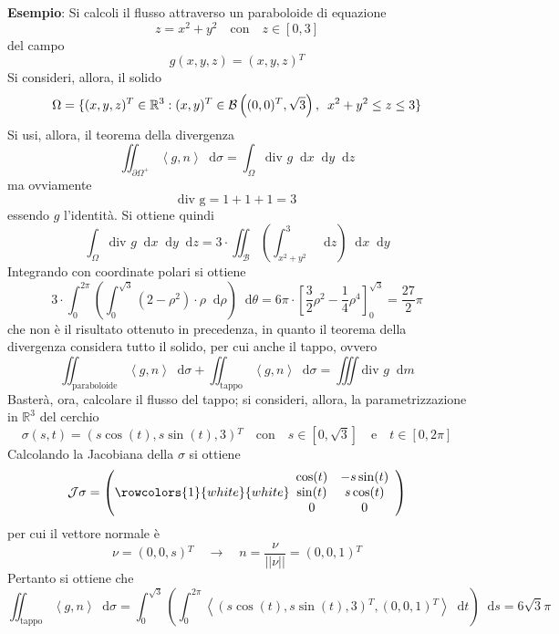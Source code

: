 \documentclass[a4paper]{extarticle}
\newcommand*\dif{\mathop{}\!\mathrm{d}}
\begin{document}
\vspace{2em}
\noindent
\textbf{Esempio}: Si calcoli il flusso attraverso un paraboloide di equazione
\[z=x^2+y^2 \hspace{1em} \text{con} \hspace{1em} z \in [0,3]\]
del campo
\[g(x,y,z)=(x,y,z){^T}\]
Si consideri, allora, il solido
\[\Omega = \{(x,y,z){^T} \in \mathbb{R}^3 : (x,y){^T} \in \mathcal{B}\left((0,0){^T},\sqrt{3} \right), \hspace{0.5em} x^2+y^2 \leq z \leq 3\}\]
Si usi, allora, il teorema della divergenza
\[\iint_{\partial \Omega^+} \left<g,n\right> \dif \sigma = \int_{\Omega} \text{div } g \dif x \dif y \dif z\]
ma ovviamente
\[\text{div g} = 1+1+1=3\]
essendo $g$ l'identità. Si ottiene quindi
\[\int_{\Omega} \text{div } g \dif x \dif y \dif z = 3 \cdot \iint_\mathcal{B} \left(\int_{x^2+y^2}^3 \dif z\right) \dif x \dif y\]
Integrando con coordinate polari si ottiene
\[3 \cdot \int_0^{2\pi} \left(\int_0^{\sqrt{3}} \left(2-\rho^2\right) \cdot \rho \dif \rho\right) \dif \theta = 6\pi \cdot \left[\dfrac{3}{2} \rho^2 - \dfrac{1}{4} \rho^4\right]_0^{\sqrt{3}} = \dfrac{27}{2} \pi\]
che non è il risultato ottenuto in precedenza, in quanto il teorema della divergenza considera tutto il solido, per cui anche il tappo, ovvero
\[\iint_{\text{paraboloide}} \left<g,n\right> \dif \sigma + \iint_\text{tappo} \left<g,n\right> \dif \sigma = \iiint \text{div } g \dif m\]
Basterà, ora, calcolare il flusso del tappo; si consideri, allora, la parametrizzazione in $\mathbb{R}^3$ del cerchio
\[\sigma(s,t) = \left(s \cos(t), s \sin(t), 3\right){^T} \hspace{1em} \text{con} \hspace{1em} s \in [0,\sqrt{3}] \hspace{1em} \text{e} \hspace{1em} t \in [0,2\pi]\]
Calcolando la Jacobiana della $\sigma$ si ottiene
\[\mathcal{J} \sigma = \left(
    \rowcolors{1}{white}{white}
    \begin{array}{cc}
        \cos(t) & - s \sin(t)\\
        \sin(t) & s \cos(t)\\
        0 & 0\\
    \end{array}
\right)\]
per cui il vettore normale è
\[\nu = \left(0,0,s\right){^T} \hspace{1em} \rightarrow \hspace{1em} n=\dfrac{\nu}{\vert\vert\nu\vert\vert}=(0,0,1){^T}\]
Pertanto si ottiene che
\[\iint_{\text{tappo}} \left<g,n\right> \dif \sigma = \int_0^{\sqrt{3}} \left(\int_0^{2\pi} \left<(s \cos(t),s \sin(t), 3){^T},(0,0,1){^T}\right>\dif t\right) \dif s = 6 \sqrt{3} \pi\]
\end{document}
